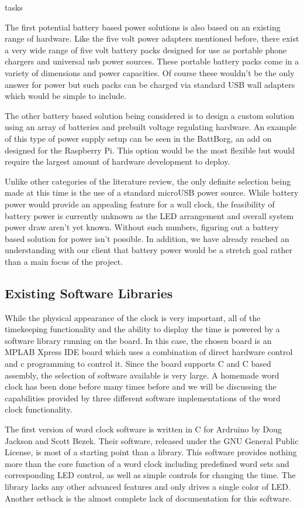 tasks\documentclass[onecolumn, draftclsnofoot,10pt, compsoc]{IEEEtran}
\begin{document}
The first potential battery based power solutions is also based on an existing range of hardware.
Like the five volt power adapters mentioned before, there exist a very wide range of five volt battery packs designed for use as portable phone chargers and universal usb power sources.
These portable battery packs come in a variety of dimensions and power capacities.
Of course these wouldn’t be the only answer for power but such packs can be charged via standard USB wall adapters which would be simple to include.

The other battery based solution being considered is to design a custom solution using an array of batteries and prebuilt voltage regulating hardware.
An example of this type of power supply setup can be seen in the BattBorg, an add on designed for the Raspberry Pi. \cite{power1}
This option would be the most flexible but would require the largest amount of hardware development to deploy.

Unlike other categories of the literature review, the only definite selection being made at this time is the use of a standard microUSB power source.
While battery power would provide an appealing feature for a wall clock, the feasibility of battery power is currently unknown as the LED arrangement and overall system power draw aren’t yet known.
Without such numbers, figuring out a battery based solution for power isn’t possible.
In addition, we have already reached an understanding with our client that battery power would be a stretch goal rather than a main focus of the project.

\subsection{Existing Software Libraries}

While the physical appearance of the clock is very important, all of the timekeeping functionality and the ability to display the time is powered by a software library running on the board.
In this case, the chosen board is an MPLAB Xpress IDE board which uses a combination of direct hardware control and c programming to control it.
Since the board supports C and C based assembly, the selection of software available is very large.
A homemade word clock has been done before many times before and we will be discussing the capabilities provided by three different software implementations of the word clock functionality.

The first version of word clock software is written in C for Ardruino by Doug Jackson and Scott Bezek.
Their software, released under the GNU General Public License, is most of a starting point than a library. \cite{software1}
This software provides nothing more than the core function of a word clock including predefined word sets and corresponding LED control, as well as simple controls for changing the time.
The library lacks any other advanced features and only drives a single color of LED.
Another setback is the almost complete lack of documentation for this software.
\end{document}
